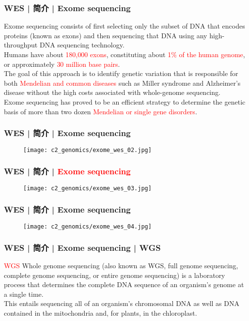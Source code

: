 \begin{frame}
  \frametitle{WES | 简介 | Exome sequencing}
  Exome sequencing consists of first selecting only the subset of DNA that encodes proteins (known as exons) and then sequencing that DNA using any high-throughput DNA sequencing technology.\\
  \vspace{1em}
  Humans have about \textcolor{red}{180,000 exons}, constituting about \textcolor{red}{1\% of the human genome}, or approximately \textcolor{red}{30 million base pairs}.\\
  \vspace{1em}
  The goal of this approach is to identify genetic variation that is responsible for both \textcolor{red}{Mendelian and common diseases} such as Miller syndrome and Alzheimer's disease without the high costs associated with whole-genome sequencing.\\
  \vspace{1em}
  Exome sequencing has proved to be an efficient strategy to determine the genetic basis of more than two dozen \textcolor{red}{Mendelian or single gene disorders}.
\end{frame}

\begin{frame}
  \frametitle{WES | 简介 | Exome sequencing}
  \begin{figure}
    \centering
    \texttt{[image: c2\_genomics/exome\_wes\_02.jpg]}
  \end{figure}
\end{frame}

\begin{frame}
  \frametitle{WES | 简介 | \textcolor{red}{Exome sequencing}}
  \begin{figure}
    \centering
    \texttt{[image: c2\_genomics/exome\_wes\_03.jpg]}
  \end{figure}
\end{frame}

\begin{frame}
  \frametitle{WES | 简介 | Exome sequencing}
  \begin{figure}
    \centering
    \texttt{[image: c2\_genomics/exome\_wes\_04.jpg]}
  \end{figure}
\end{frame}

\begin{frame}
  \frametitle{WES | 简介 | Exome sequencing | WGS}
  \begin{block}{\textcolor{red}{WGS}}
    Whole genome sequencing (also known as WGS, full genome sequencing, complete genome sequencing, or entire genome sequencing) is a laboratory process that determines the complete DNA sequence of an organism's genome at a single time.\\
    \vspace{1em}
    This entails sequencing all of an organism's chromosomal DNA as well as DNA contained in the mitochondria and, for plants, in the chloroplast.
  \end{block}
\end{frame}

